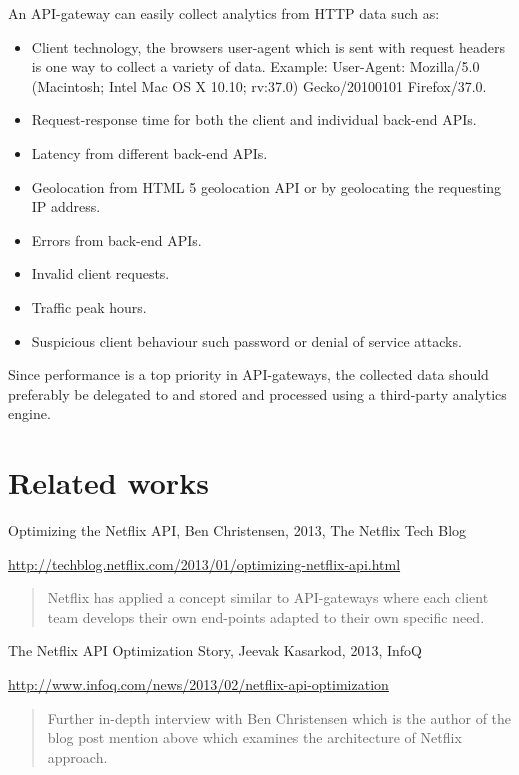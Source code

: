 \documentclass{cslthse-msc}
\begin{document}
An API-gateway can easily collect analytics from HTTP data such as:
\begin{itemize}
	\item Client technology, the browsers user-agent which is sent with request headers is one way to collect a variety of data. Example: User-Agent: Mozilla/5.0 (Macintosh; Intel Mac OS X 10.10; rv:37.0) Gecko/20100101 Firefox/37.0.
	\item Request-response time for both the client and individual back-end APIs.
	\item Latency from different back-end APIs.
	\item Geolocation from HTML 5 geolocation API\cite{html5_geolocation} or by geolocating the requesting IP address.
	\item Errors from back-end APIs.
	\item Invalid client requests.
	\item Traffic peak hours.
	\item Suspicious client behaviour such password or denial of service attacks.
\end{itemize}

Since performance is a top priority in API-gateways, the collected data should preferably be delegated to and stored and processed using a third-party analytics engine.

\section{Related works}
Optimizing the Netflix API, Ben Christensen, 2013, The Netflix Tech Blog

\noindent \url{http://techblog.netflix.com/2013/01/optimizing-netflix-api.html}

\begin{quote}
	Netflix has applied a concept similar to API-gateways where each client team develops their own end-points adapted to their own specific need.
\end{quote}

\vspace{5mm}

\noindent The Netflix API Optimization Story, Jeevak Kasarkod, 2013, InfoQ

\noindent \url{http://www.infoq.com/news/2013/02/netflix-api-optimization}

\begin{quote}
	Further in-depth interview with Ben Christensen which is the author of the blog post mention above which examines the architecture of Netflix approach.
\end{quote}
\end{document}
